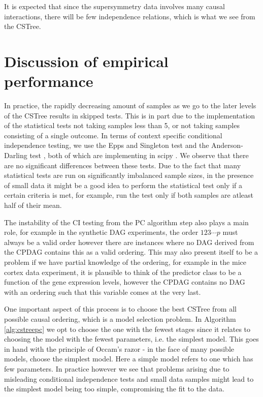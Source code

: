 \documentclass{tufte-book}
\begin{document}
It is expected that since the supersymmetry data involves many causal interactions, there will be few independence relations, which is what we see from the CSTree.


\section{Discussion of empirical performance}
\label{sec:org6a4eb4d}

In practice, the rapidly decreasing amount of samples as we go to the later levels of the CSTree results in skipped tests. This is in part due to the implementation of the statistical tests not taking samples less than 5, or not taking samples consisting of a single outcome. In terms of context specific conditional independence testing, we use the Epps and Singleton test \cite{epps-1986-omnib-test} and the Anderson-Darling test \cite{scholz-1987-k-sampl}, both of which are implementing in scipy \cite{virtanen-2020-scipy}. We observe that there are no significant differences between these tests. Due to the fact that many statistical tests are run on significantly imbalanced sample sizes, in the presence of small data it might be a good idea to perform the statistical test only if a certain criteria is met, for example, run the test only if both samples are atleast half of their mean. 


The instability of the CI testing from the PC algorithm step also plays a main role, for example in the synthetic DAG experiments, the order \(123\cdots p\) must always be a valid order however there are instances where no DAG derived from the CPDAG contains this as a valid ordering. This may also present itself to be a problem if we have partial knowledge of the ordering, for example in the mice cortex data experiment, it is plausible to think of the predictor class to be a function of the gene expression levels, however the CPDAG contains no DAG with an ordering such that this variable comes at the very last.


One important aspect of this process is to choose the best CSTree from all possible causal ordering, which is a model selection problem. In Algorithm \ref{alg:cstreepc} we opt to choose the one with the fewest stages since it relates to choosing the model with the fewest parameters, i.e. the simplest model. This goes in hand with the principle of Occam's razor - in the face of many possible models, choose the simplest model. Here a simple model refers to one which has few parameters. In practice however we see that problems arising due to misleading conditional independence tests and small data samples might lead to the simplest model being too simple, compromising the fit to the data.
\end{document}
